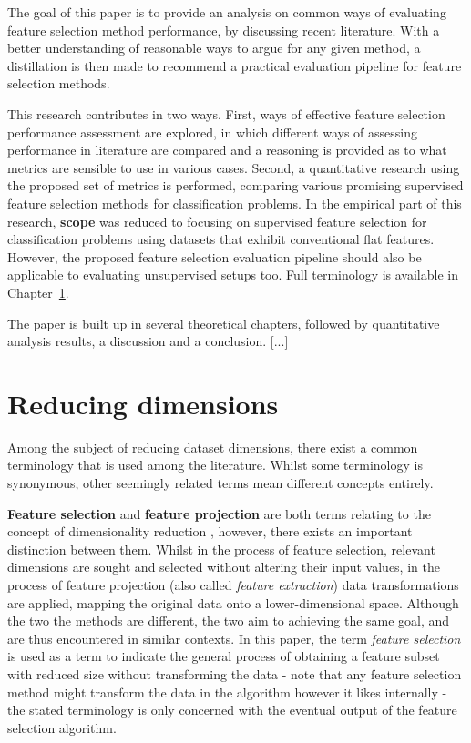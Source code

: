 \documentclass{article}
\begin{document}
The goal of this paper is to provide an analysis on common ways of evaluating feature selection method performance, by discussing recent literature. With a better understanding of reasonable ways to argue for any given method, a distillation is then made to recommend a practical evaluation pipeline for feature selection methods.

This research contributes in two ways. First, ways of effective feature selection performance assessment are explored, in which different ways of assessing performance in literature are compared and a reasoning is provided as to what metrics are sensible to use in various cases. Second, a quantitative research using the proposed set of metrics is performed, comparing various promising supervised feature selection methods for classification problems. In the empirical part of this research, \textbf{scope} was reduced to focusing on supervised feature selection for classification problems using datasets that exhibit conventional flat features. However, the proposed feature selection evaluation pipeline should also be applicable to evaluating unsupervised setups too. Full terminology is available in Chapter~\ref{sec:reducing-dimensions}.

The paper is built up in several theoretical chapters, followed by quantitative analysis results, a discussion and a conclusion. [...]

\section{Reducing dimensions}\label{sec:reducing-dimensions}
Among the subject of reducing dataset dimensions, there exist a common terminology that is used among the literature. Whilst some terminology is synonymous, other seemingly related terms mean different concepts entirely.

\textbf{Feature selection} and \textbf{feature projection} are both terms relating to the concept of dimensionality reduction \citep{cunningham2007dimension}, however, there exists an important distinction between them. Whilst in the process of feature selection, relevant dimensions are sought and selected without altering their input values, in the process of feature projection (also called \textit{feature extraction}) data transformations are applied, mapping the original data onto a lower-dimensional space. Although the two the methods are different, the two aim to achieving the same goal, and are thus encountered in similar contexts. In this paper, the term \textit{feature selection} is used as a term to indicate the general process of obtaining a feature subset with reduced size without transforming the data - note that any feature selection method might transform the data in the algorithm however it likes internally - the stated terminology is only concerned with the eventual output of the feature selection algorithm.
\end{document}
